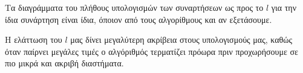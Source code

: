 Τα διαγράμματα του πλήθους υπολογισμών των συναρτήσεων ως προς το $l$ για την ίδια συνάρτηση είναι 
ίδια, όποιον από τους αλγορίθμους και αν εξετάσουμε.

Η ελάττωση του $l$ μας δίνει μεγαλύτερη ακρίβεια στους υπολογισμούς μας, καθώς όταν παίρνει μεγάλες τιμές
ο αλγόριθμός τερματίζει πρόωρα πριν προχωρήσουμε σε πιο μικρά και ακριβή διαστήματα. 


